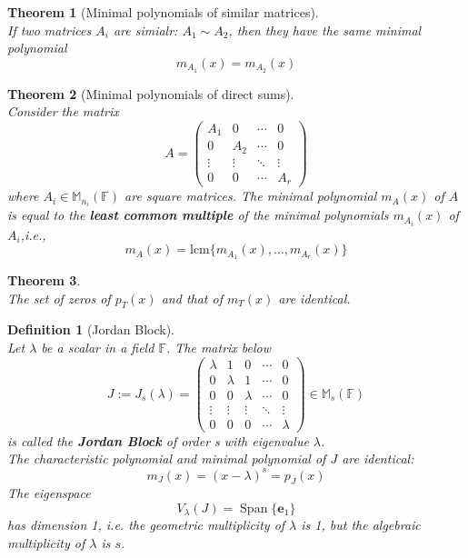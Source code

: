 \documentclass[12pt]{article}
\newcommand{\lcm}{\mathrm{lcm}}
\newtheorem{definition}{Definition}[section]
\newtheorem{theorem}{Theorem}[section]
\theoremstyle{definition}
\DeclareMathOperator{\spn}{Span}
\begin{document}
\begin{theorem}[Minimal polynomials of similar matrices]
\hfill\\\normalfont If two matrices $A_i$ are simialr: $A_1\sim A_2$, then they have the same minimal polynomial
\[
m_{A_1}(x)=m_{A_2}(x)
\]
\end{theorem}
\begin{theorem}[Minimal polynomials of direct sums]
\hfill\\\normalfont Consider the matrix 
\[
A=\begin{pmatrix}
A_1&0&\cdots&0\\
0&A_2&\cdots&0\\
\vdots&\vdots&\ddots&\vdots\\
0&0&\cdots&A_r
\end{pmatrix}
\]
where $A_i\in\mathbb{M}_{n_i}(\mathbb{F})$ are square matrices. The minimal polynomial $m_A(x)$ of $A$ is equal to the \textbf{least common multiple} of the minimal polynomials $m_{A_i}(x)$ of $A_i$,i.e.,
\[
m_A(x)=\lcm\{m_{A_1}(x),\ldots,m_{A_r}(x)\}
\]
\end{theorem}
\begin{theorem}
\hfill\\\normalfont The set of zeros of $p_T(x)$ and that of $m_T(x)$ are identical.
\end{theorem}
\begin{definition}[Jordan Block]
\hfill\\\normalfont Let $\lambda$ be a scalar in a field $\mathbb{F}$. The matrix below
\[
J:=J_s(\lambda)=\begin{pmatrix}
\lambda&1&0&\cdots&0\\
0&\lambda&1&\cdots&0\\
0&0&\lambda&\cdots&0\\
\vdots&\vdots&\vdots&\ddots&\vdots\\
0&0&0&\cdots&\lambda
\end{pmatrix}\in\mathbb{M}_s(\mathbb{F})
\]
is called the \textbf{Jordan Block} of order s with eigenvalue $\lambda$.\\
The characteristic polynomial and minimal polynomial of $J$ are identical:
\[
m_J(x)=(x-\lambda)^s = p_J(x)
\]
The eigenspace 
\[
V_\lambda(J)=\spn\{\mathbf{e}_1\}
\]
has dimension 1, i.e. the geometric multiplicity of $\lambda$  is 1, but the algebraic multiplicity of $\lambda$ is $s$.
\end{definition}
\end{document}
